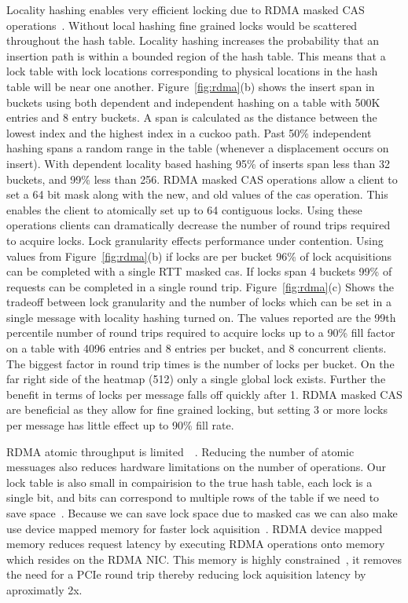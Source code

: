 Locality hashing enables very efficient locking due to RDMA
masked CAS
operations~\cite{advanced-transport,scalable-locks}. Without
local hashing fine grained locks would be scattered
throughout the hash table. Locality hashing increases the
probability that an insertion path is within a bounded
region of the hash table.  This means that a lock table with
lock locations corresponding to physical locations in the
hash table will be near one another.  
Figure~\ref{fig:rdma}(b) shows the insert span in buckets
using both dependent and independent hashing on a table with
500K entries and 8 entry buckets. A span is calculated as
the distance between the lowest index and the highest index
in a cuckoo path. Past 50\% independent hashing spans a
random range in the table (whenever a displacement occurs on
insert). With dependent locality based hashing 95\% of
inserts span less than 32 buckets, and 99\% less than 256.
RDMA masked CAS operations allow a client to set a 64 bit
mask along with the new, and old values of the cas
operation. This enables the client to atomically set up to
64 contiguous locks. Using these operations clients can
dramatically decrease the number of round trips required to
acquire locks.
Lock granularity effects performance under contention. Using
values from Figure~\ref{fig:rdma}(b) if locks are per bucket
96\% of lock acquisitions can be completed with a single RTT
masked cas. If locks span 4 buckets 99\% of requests can be
completed in a single round trip.
Figure~\ref{fig:rdma}(c) Shows the tradeoff between lock
granularity and the number of locks which can be set in a
single message with locality hashing turned on. The values
reported are the 99th percentile number of round trips
required to acquire locks up to a 90\% fill factor on a
table with 4096 entries and 8 entries per bucket, and 8
concurrent clients. The biggest factor in round trip times
is the number of locks per bucket. On the far right side of
the heatmap (512) only a single global lock exists. Further
the benefit in terms of locks per message falls off quickly
after 1. RDMA masked CAS are beneficial as they allow for
fine grained locking, but setting 3 or more locks per
message has little effect up to 90\% fill rate.

RDMA atomic throughput is
limited~\cite{design-guidelines}~\todo{[swordbox]}. Reducing
the number of atomic messuages also reduces hardware
limitations on the number of operations. Our lock table is
also small in compairision to the true hash table, each lock
is a single bit, and bits can correspond to multiple rows of
the table if we need to save space~. Because we can save lock space due to
masked cas we can also make use device mapped memory for
faster lock aquisition~\cite{sherman}. RDMA device mapped
memory reduces request latency by executing RDMA operations
onto memory which resides on the RDMA NIC. This memory is
highly constrained~, it removes the need
for a PCIe round trip thereby reducing lock aquisition
latency by aproximatly 2x.

